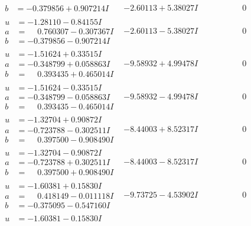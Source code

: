 \documentclass[1p]{elsarticle_modified}
\theoremstyle{definition}
\begin{document}
$$\begin{array}{c|c|c}
\begin{aligned}
b &= -0.379856 + 0.907214 I\end{aligned}
 & -2.60113 + 5.38027 I & \phantom{-0.000000 } 0 \\ \hline\begin{aligned}
u &= -1.28110 - 0.84155 I \\
a &= \phantom{-}0.760307 - 0.307367 I \\
b &= -0.379856 - 0.907214 I\end{aligned}
 & -2.60113 - 5.38027 I & \phantom{-0.000000 } 0 \\ \hline\begin{aligned}
u &= -1.51624 + 0.33515 I \\
a &= -0.348799 + 0.058863 I \\
b &= \phantom{-}0.393435 + 0.465014 I\end{aligned}
 & -9.58932 + 4.99478 I & \phantom{-0.000000 } 0 \\ \hline\begin{aligned}
u &= -1.51624 - 0.33515 I \\
a &= -0.348799 - 0.058863 I \\
b &= \phantom{-}0.393435 - 0.465014 I\end{aligned}
 & -9.58932 - 4.99478 I & \phantom{-0.000000 } 0 \\ \hline\begin{aligned}
u &= -1.32704 + 0.90872 I \\
a &= -0.723788 - 0.302511 I \\
b &= \phantom{-}0.397500 - 0.908490 I\end{aligned}
 & -8.44003 + 8.52317 I & \phantom{-0.000000 } 0 \\ \hline\begin{aligned}
u &= -1.32704 - 0.90872 I \\
a &= -0.723788 + 0.302511 I \\
b &= \phantom{-}0.397500 + 0.908490 I\end{aligned}
 & -8.44003 - 8.52317 I & \phantom{-0.000000 } 0 \\ \hline\begin{aligned}
u &= -1.60381 + 0.15830 I \\
a &= \phantom{-}0.418149 - 0.011118 I \\
b &= -0.375095 - 0.547160 I\end{aligned}
 & -9.73725 - 4.53902 I & \phantom{-0.000000 } 0 \\ \hline\begin{aligned}
u &= -1.60381 - 0.15830 I \\

\end{aligned}
\end{array}$$
\end{document}
